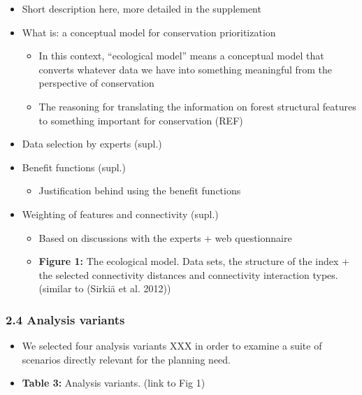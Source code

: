 \documentclass[]{article}
\begin{document}
\begin{itemize}
\item
  Short description here, more detailed in the supplement
\item
  What is: a conceptual model for conservation prioritization

  \begin{itemize}
  \itemsep1pt\parskip0pt
  \item
    In this context, ``ecological model'' means a conceptual model that
    converts whatever data we have into something meaningful from the
    perspective of conservation
  \item
    The reasoning for translating the information on forest structural
    features to something important for conservation (REF)
  \end{itemize}
\item
  Data selection by experts (supl.)
\item
  Benefit functions (supl.)

  \begin{itemize}
  \itemsep1pt\parskip0pt
  \item
    Justification behind using the benefit functions
  \end{itemize}
\item
  Weighting of features and connectivity (supl.)

  \begin{itemize}
  \itemsep1pt\parskip0pt
  \item
    Based on discussions with the experts + web questionnaire
  \item
    \textbf{Figure 1:} The ecological model. Data sets, the structure of
    the index + the selected connectivity distances and connectivity
    interaction types. (similar to (Sirkiä et al. 2012)⁠)
  \end{itemize}
\end{itemize}

\subsubsection{2.4 Analysis variants}

\begin{itemize}
\item
  We selected four analysis variants XXX in order to examine a suite of
  scenarios directly relevant for the planning need.
\item
  \textbf{Table 3:} Analysis variants. (link to Fig 1)
\end{itemize}
\end{document}
